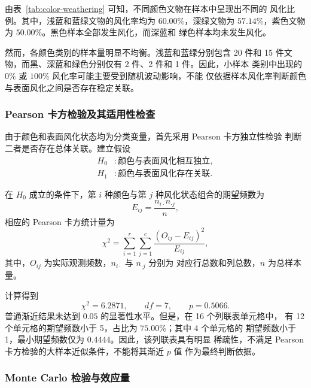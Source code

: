 \documentclass[UTF8,a4paper,12pt,fontset=fandol]{ctexart}
\begin{document}
由表~\ref{tab:color-weathering} 可知，不同颜色文物在样本中呈现出不同的
风化比例。其中，浅蓝和蓝绿文物的风化率均为 $60.00\%$，深绿文物为
$57.14\%$，紫色文物为 $50.00\%$。黑色样本全部发生风化，而深蓝和
绿色样本均未发生风化。

然而，各颜色类别的样本量明显不均衡。浅蓝和蓝绿分别包含 20 件和
15 件文物，而黑、深蓝和绿色分别仅有 2 件、2 件和 1 件。因此，小样本
类别中出现的 $0\%$ 或 $100\%$ 风化率可能主要受到随机波动影响，不能
仅依据样本风化率判断颜色与表面风化之间是否存在稳定关联。

\subsubsection{Pearson 卡方检验及其适用性检查}

由于颜色和表面风化状态均为分类变量，首先采用 Pearson 卡方独立性检验
判断二者是否存在总体关联。建立假设
\begin{equation}
    \begin{aligned}
        H_0 &: \text{颜色与表面风化相互独立},\\
        H_1 &: \text{颜色与表面风化存在关联}.
    \end{aligned}
\end{equation}

在 $H_0$ 成立的条件下，第 $i$ 种颜色与第 $j$ 种风化状态组合的期望频数为
\begin{equation}
    E_{ij}=\frac{n_{i\cdot}n_{\cdot j}}{n},
\end{equation}
相应的 Pearson 卡方统计量为
\begin{equation}
    \chi^2=\sum_{i=1}^{r}\sum_{j=1}^{c}
    \frac{(O_{ij}-E_{ij})^2}{E_{ij}},
\end{equation}
其中，$O_{ij}$ 为实际观测频数，$n_{i\cdot}$ 与 $n_{\cdot j}$ 分别为
对应行总数和列总数，$n$ 为总样本量。

计算得到
\begin{equation}
    \chi^2=6.2871,\qquad df=7,\qquad p=0.5066.
\end{equation}
普通渐近结果未达到 $0.05$ 的显著性水平。但是，在 16 个列联表单元格中，
有 12 个单元格的期望频数小于 5，占比为 $75.00\%$；其中 4 个单元格的
期望频数小于 1，最小期望频数仅为 $0.4444$。因此，该列联表具有明显
稀疏性，不满足 Pearson 卡方检验的大样本近似条件，不能将其渐近 $p$ 值
作为最终判断依据。

\subsubsection{Monte Carlo 检验与效应量}
\end{document}
